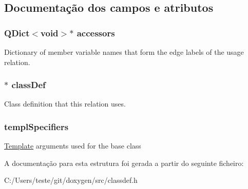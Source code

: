 \subsection{Documentação dos campos e atributos}
\hypertarget{struct_uses_class_def_a09840d2953c15cffee45345c1937d048}{
\subsubsection[{accessors}]{\setlength{\rightskip}{0pt plus 5cm}Q\-Dict$<$void$>$$\ast$ accessors}}\label{struct_uses_class_def_a09840d2953c15cffee45345c1937d048}
Dictionary of member variable names that form the edge labels of the usage relation. \hypertarget{struct_uses_class_def_a9ecae2706174bc69faacb7156966b12e}{
\subsubsection[{class\-Def}]{$\ast$ class\-Def}}\label{struct_uses_class_def_a9ecae2706174bc69faacb7156966b12e}
Class definition that this relation uses. \hypertarget{struct_uses_class_def_aea659c4ea8200bb40a20fa289d5acc72}{
\subsubsection[{templ\-Specifiers}]{ templ\-Specifiers}}\label{struct_uses_class_def_aea659c4ea8200bb40a20fa289d5acc72}
\hyperlink{class_template}{Template} arguments used for the base class 

A documentação para esta estrutura foi gerada a partir do seguinte ficheiro\-:\begin{DoxyCompactItemize}
\item 
C\-:/\-Users/teste/git/doxygen/src/classdef.\-h\end{DoxyCompactItemize}
